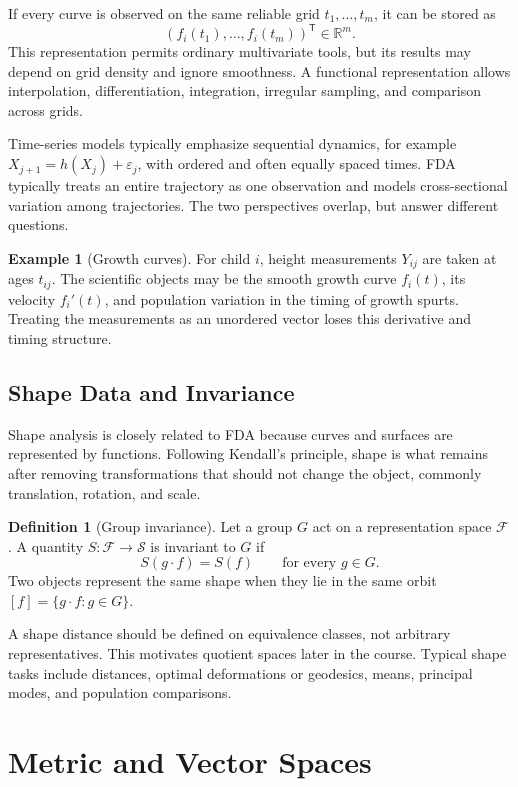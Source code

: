 \documentclass[12pt,oneside]{book}
\numberwithin{equation}{section}
\theoremstyle{definition}
\newtheorem{definition}{Definition}[section]
\newtheorem{example}{Example}[section]
\theoremstyle{plain}
\theoremstyle{remark}
\newcommand{\R}{\mathbb{R}}
\begin{document}
If every curve is observed on the same reliable grid
$t_1,\ldots,t_m$, it can be stored as
\[
    (f_i(t_1),\ldots,f_i(t_m))^\mathsf T\in\R^m.
\]
This representation permits ordinary multivariate tools, but its results may
depend on grid density and ignore smoothness. A functional representation
allows interpolation, differentiation, integration, irregular sampling, and
comparison across grids.

Time-series models typically emphasize sequential dynamics, for example
$X_{j+1}=h(X_j)+\varepsilon_j$, with ordered and often equally spaced times.
FDA typically treats an entire trajectory as one observation and models
cross-sectional variation among trajectories. The two perspectives overlap,
but answer different questions.

\begin{example}[Growth curves]
For child $i$, height measurements $Y_{ij}$ are taken at ages $t_{ij}$. The
scientific objects may be the smooth growth curve $f_i(t)$, its velocity
$f_i'(t)$, and population variation in the timing of growth spurts. Treating
the measurements as an unordered vector loses this derivative and timing
structure.
\end{example}

\subsection{Shape Data and Invariance}

Shape analysis is closely related to FDA because curves and surfaces are
represented by functions. Following Kendall's principle, shape is what
remains after removing transformations that should not change the object,
commonly translation, rotation, and scale.

\begin{definition}[Group invariance]
Let a group $G$ act on a representation space $\mathcal F$. A quantity
$S:\mathcal F\to\mathcal S$ is invariant to $G$ if
\[
    S(g\cdot f)=S(f)\qquad\text{for every }g\in G.
\]
Two objects represent the same shape when they lie in the same orbit
$[f]=\{g\cdot f:g\in G\}$.
\end{definition}

A shape distance should be defined on equivalence classes, not arbitrary
representatives. This motivates quotient spaces later in the course. Typical
shape tasks include distances, optimal deformations or geodesics, means,
principal modes, and population comparisons.

\section{Metric and Vector Spaces}
\end{document}
